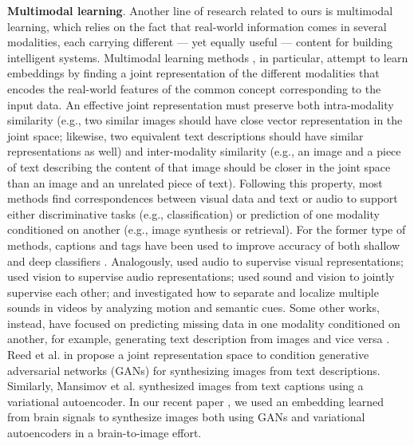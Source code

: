 \documentclass[10pt,journal,compsoc,twocolumn]{IEEEtran}
\begin{document}
{\bf Multimodal learning}. Another line of research related to ours is multimodal learning, which relies on the fact that real-world information comes in several modalities, each carrying different --- yet equally useful --- content for building intelligent systems. 
Multimodal learning methods \cite{conf/icml/NgiamKKNLN11,NIPS2014_5279,JMLR:v15:srivastava14b}, in particular,  attempt to learn embeddings by finding a joint representation of the different modalities that encodes the real-world features of the common concept corresponding to the input data.
An effective joint representation must preserve both intra-modality similarity (e.g., two similar images should have close vector representation in the joint space; likewise, two equivalent text descriptions should have similar representations as well) and inter-modality similarity (e.g., an image and a piece of text describing the content of that image should be closer in the joint space than an image and an unrelated piece of text).
Following this property, most methods find correspondences between visual data and text \cite{Venugopalan_2017_CVPR,NIPS2017_6658,5540120,JMLR:v15:srivastava14b} or audio \cite{zhao2018sound,10.1007/978,Aytar:20166,7952132} to support either discriminative tasks (e.g., classification) or prediction of one modality conditioned on another (e.g., image synthesis or retrieval).  
For the former type of methods, captions and tags have been used to improve accuracy of both shallow and deep classifiers \cite{5540120,Huiskes:2010}. Analogously, \cite{10.1007/978} used audio to supervise visual representations; \cite{Aytar:20166,7952132} used vision to supervise audio representations; \cite{Arandjelovic_2017_ICCV} used sound and vision to jointly supervise each other; and \cite{zhao2018sound} investigated how to separate and localize multiple sounds in videos by analyzing motion and semantic cues. 
Some other works, instead, have focused on predicting missing data in one modality conditioned on another, for example, generating text description from images and vice versa \cite{43274,KarpathyF17,DonahueHGRVDS15,pmlr-v48-reed16,MansimovPBS15}. Reed et al. in \cite{pmlr-v48-reed16} propose a joint representation space to condition generative adversarial networks (GANs) for synthesizing images from text descriptions. Similarly, Mansimov et al. \cite{MansimovPBS15} synthesized images from text captions using a variational autoencoder. In our recent paper \cite{Kavasidis:2017}, we used an embedding learned from brain signals to synthesize images both using GANs and variational autoencoders in a brain-to-image effort.
\end{document}
